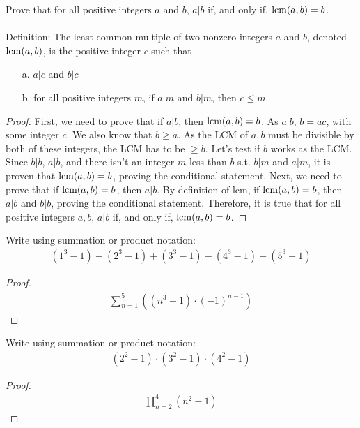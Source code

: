 \documentclass[name=Ojas\ Chaturvedi, emailid=oj.chaturvedi.2024, course=Capstone:\ Discrete\ Math, num=8, deadline={November\ 2,\ 2023}]{homework}
\begin{document}
Prove that for all positive integers $a$ and $b$, $a | b$ if, and only if, $\operatorname{lcm}(a,b) = b$. \\ \\
Definition: The least common multiple of two nonzero integers $a$ and $b$, denoted $\operatorname{lcm}(a,b)$, is the positive integer $c$ such that
\begin{enumerate}
    \item[a.] $a|c$ and $b|c$
    \item[b.] for all positive integers $m$, if $a|m$ and $b|m$, then $c \leq m$.
\end{enumerate}
\begin{proof}
    First, we need to prove that if $a | b$, then $\operatorname{lcm}(a, b) = b$. As $a | b$, $b = ac$, with some integer $c$. We also know that $b\geq a$. As the LCM of $a, b$ must be divisible by both of these integers, the LCM has to be $\geq b$. Let's test if $b$ works as the LCM. Since $b | b$, $a | b$, and there isn't an integer $m$ less than $b$ s.t. $b | m$ and $a | m$, it is proven that $\operatorname{lcm}(a, b) = b$, proving the conditional statement. Next, we need to prove that if $\operatorname{lcm}(a, b) = b$, then $a | b$. By definition of lcm, if $\operatorname{lcm}(a, b) = b$, then $a | b$ and $b | b$, proving the conditional statement. Therefore, it is true that for all positive integers $a, b$, $a | b$ if, and only if, $\operatorname{lcm}(a, b) = b$.
\end{proof}

\separator

Write using summation or product notation:
\begin{align*}
    \left(1^3-1\right)-\left(2^3-1\right)+\left(3^3-1\right)-\left(4^3-1\right)+\left(5^3-1\right)
\end{align*}
\begin{proof}
    \begin{align*}
        \sum_{n=1}^{5} ((n^3-1) \cdot (-1)^{n-1})
    \end{align*}
\end{proof}

Write using summation or product notation:
\begin{align*}
    \left(2^2-1\right) \cdot\left(3^2-1\right) \cdot\left(4^2-1\right)
\end{align*}
\begin{proof}
    \begin{align*}
        \prod_{n=2}^{4} (n^2 -1)
    \end{align*}
\end{proof}
\end{document}
